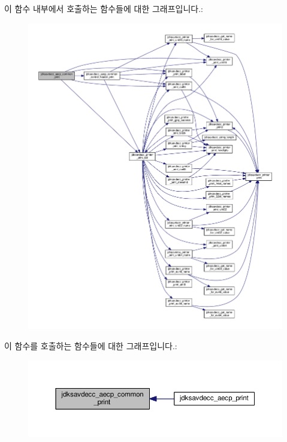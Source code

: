 이 함수 내부에서 호출하는 함수들에 대한 그래프입니다.\+:
\nopagebreak
\begin{figure}[H]
\begin{center}
\leavevmode
\includegraphics[width=350pt]{group__aecp__print_gabf23e817595afca199205bb410a5eca6_cgraph}
\end{center}
\end{figure}




이 함수를 호출하는 함수들에 대한 그래프입니다.\+:
\nopagebreak
\begin{figure}[H]
\begin{center}
\leavevmode
\includegraphics[width=350pt]{group__aecp__print_gabf23e817595afca199205bb410a5eca6_icgraph}
\end{center}
\end{figure}


